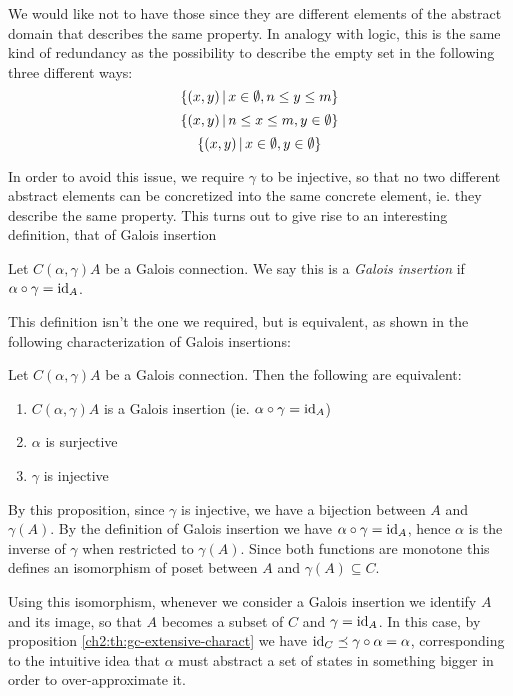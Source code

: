 We would like not to have those since they are different elements of the abstract domain that describes the same property. In analogy with logic, this is the same kind of redundancy as the possibility to describe the empty set in the following three different ways:
\[
\{ (x, y) \,\vert\, x \in \emptyset, n \le y \le m \}
\]
\[
\{ (x, y) \,\vert\, n \le x \le m, y \in \emptyset \}
\]
\[
\{ (x, y) \,\vert\, x \in \emptyset, y \in \emptyset \}
\]

In order to avoid this issue, we require $\gamma$ to be injective, so that no two different abstract elements can be concretized into the same concrete element, ie. they describe the same property. This turns out to give rise to an interesting definition, that of Galois insertion

\begin{definition}\label{ch2:def:gi}
	Let $C (\alpha, \gamma) A$ be a Galois connection. We say this is a \textit{Galois insertion} if $\alpha \circ \gamma = \text{id}_A$.
\end{definition}

This definition isn't the one we required, but is equivalent, as shown in the following characterization of Galois insertions:
\begin{prop}\label{ch2:th:gi-charact}
	Let $C (\alpha, \gamma) A$ be a Galois connection. Then the following are equivalent:
	\begin{enumerate}[label={(\arabic*)}]
		\item $C (\alpha, \gamma) A$ is a Galois insertion (ie. $\alpha \circ \gamma = \text{id}_A$)
		\item $\alpha$ is surjective
		\item $\gamma$ is injective
	\end{enumerate}
\end{prop}

By this proposition, since $\gamma$ is injective, we have a bijection between $A$ and $\gamma(A)$. By the definition of Galois insertion we have $\alpha \circ \gamma = \text{id}_A$, hence $\alpha$ is the inverse of $\gamma$ when restricted to $\gamma(A)$. Since both functions are monotone this defines an isomorphism of poset between $A$ and $\gamma(A) \subseteq C$.

Using this isomorphism, whenever we consider a Galois insertion we identify $A$ and its image, so that $A$ becomes a subset of $C$ and $\gamma = \text{id}_A$. In this case, by proposition \ref{ch2:th:gc-extensive-charact} we have $\text{id}_C \preceq \gamma \circ \alpha = \alpha$, corresponding to the intuitive idea that $\alpha$ must abstract a set of states in something bigger in order to over-approximate it.

